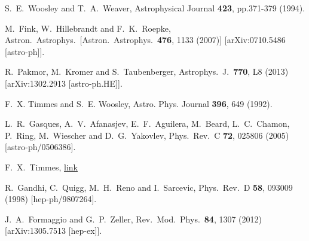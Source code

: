   S.~E.~Woosley and T.~A.~Weaver, Astrophysical Journal {\bf 423}, pp.371-379 (1994).

  M.~Fink, W.~Hillebrandt and F.~K.~Roepke,
  Astron.\ Astrophys.\ 
  [Astron.\ Astrophys.\  {\bf 476}, 1133 (2007)]
  [arXiv:0710.5486 [astro-ph]].


  R.~Pakmor, M.~Kromer and S.~Taubenberger,
  Astrophys.\ J.\  {\bf 770}, L8 (2013)
  [arXiv:1302.2913 [astro-ph.HE]].


 F.~X. Timmes and S.~E. Woosley, Astro. Phys. Journal {\bf 396}, 649 (1992).
 
  L.~R.~Gasques, A.~V.~Afanasjev, E.~F.~Aguilera, M.~Beard, L.~C.~Chamon, P.~Ring, M.~Wiescher and D.~G.~Yakovlev,
  Phys.\ Rev.\ C {\bf 72}, 025806 (2005)
  [astro-ph/0506386].

F.~X.~Timmes, \href{http://cococubed.asu.edu/code_pages/coldwd.shtml}{link}

  R.~Gandhi, C.~Quigg, M.~H.~Reno and I.~Sarcevic,
  Phys.\ Rev.\ D {\bf 58}, 093009 (1998)
  [hep-ph/9807264].


  J.~A.~Formaggio and G.~P.~Zeller,
  Rev.\ Mod.\ Phys.\  {\bf 84}, 1307 (2012)
  [arXiv:1305.7513 [hep-ex]].


